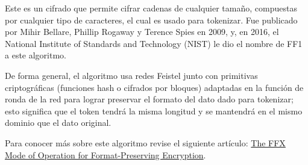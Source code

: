 %
%

Este es un cifrado que permite cifrar cadenas de cualquier
tamaño, compuestas por cualquier tipo de caracteres, el cual es
usado para tokenizar. Fue publicado por Mihir Bellare, Phillip
Rogaway y Terence Spies en 2009, y, en 2016, el National
Institute of Standards and Technology (NIST) le dio el nombre de
FF1 a este algoritmo.

De forma general, el algoritmo usa redes Feistel junto con
primitivas criptográficas (funciones hash o cifrados por bloques)
adaptadas en la función de ronda de la red para lograr preservar
el formato del dato dado para tokenizar; esto significa que el
token tendrá la misma longitud y se mantendrá en el mismo
dominio que el dato original.

Para conocer más sobre este algoritmo revise el siguiente
artículo:
\href{http://citeseerx.ist.psu.edu/viewdoc/download?doi=10.1.1.304.1736&rep=rep1&type=pdf}
{The FFX Mode of Operation for Format-Preserving Encryption}.
